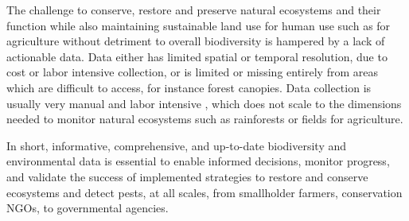 The challenge to conserve, restore and preserve natural ecosystems and their function while also maintaining sustainable land use for human use such as for agriculture without detriment to overall biodiversity is hampered by a lack of actionable data. Data either has limited spatial or temporal resolution, due to cost or labor intensive collection, or is limited or missing entirely from areas which are difficult to access, for instance forest canopies. Data collection is usually very manual and labor intensive \cite{Cannon2021}, which does not scale to the dimensions needed to monitor natural ecosystems such as rainforests or fields for agriculture. 







In short, informative, comprehensive, and up-to-date biodiversity and environmental data is essential to enable informed decisions, monitor progress, and validate the success of implemented strategies to restore and conserve ecosystems and detect pests, at all scales, from smallholder farmers, conservation NGOs, to governmental agencies. 



